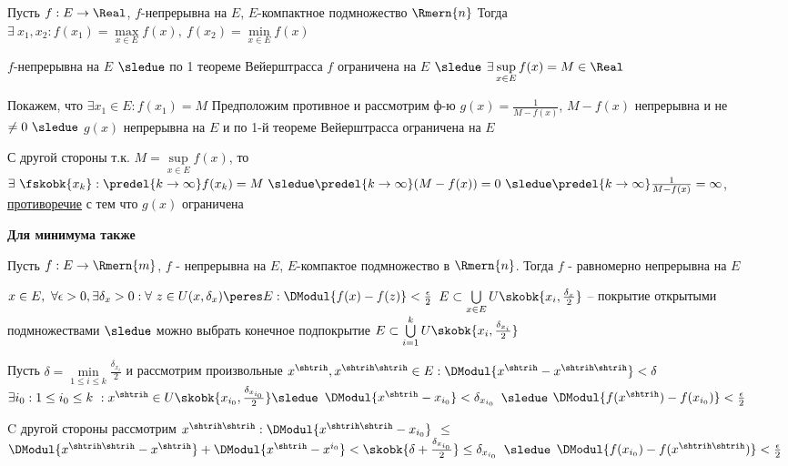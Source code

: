 \begin{proofs}
	Пусть $f:E \to \Real$, $f$-непрерывна на $E$, $E$-компактное подмножество $\Rmern{n}$ Тогда $\exists \ x_1,x_2 : f(x_1)=\max\limits_{x \in E}f(x), \ f(x_2)=\min\limits_{x \in E}f(x)$
	\begin{dokvo}
		$f$-непрерывна на $E$ $\sledue$ по 1 теореме Вейерштрасса $f$ ограничена на $E$ $\sledue$ $\exists \sup\limits_{x\in E}f(x)=M\in \Real$

		Покажем, что $\exists x_1 \in E : f(x_1)=M$ Предположим противное и рассмотрим ф-ю $g(x) = \frac{1}{M-f(x)}$, $M-f(x)$ непрерывна и не $\neq 0 \ \sledue$ $g(x)$ непрерывна на $E$ и по 1-й теореме Вейерштрасса ограничена на $E$

		С другой стороны т.к. $M=\sup\limits_{x\in E}f(x)$, то $\exists \ \fskobk{x_k}: \predel{k\to \infty}f(x_k)=M \ \sledue \predel{k\to \infty}(M-f(x))=0 \ \sledue \predel{k\to \infty}\frac{1}{M-f(x)}=\infty$, \underline{противоречие} с тем что $g(x)$ ограничена

		\textbf{Для минимума также}
	\end{dokvo}
\end{proofs}

\begin{proofs}
	Пусть $f:E\to \Rmern{m}$, $f$ - непрерывна на $E$, $E$-компактое подмножество в $\Rmern{n}$. Тогда $f$ - равномерно непрерывна на $E$
	\begin{dokvo}
		$x \in E, \ \forall \epsilon > 0, \exists \delta_x > 0: \forall \ z\in U(x, \delta_x)\peres E: \DModul{f(x)-f(z)}< \frac{\epsilon}{2}$
		$E \subset \bigcup\limits_{x\in E}U\skobk{x_i,\frac{\delta_x}{2}}$ -- покрытие открытыми подмножествами $\sledue$ можно выбрать конечное подпокрытие $E \subset \bigcup\limits_{i=1}^{k}U\skobk{x_i,\frac{\delta_{x_{i}}}{2}}$

		Пусть $\delta = \min\limits_{1 \leq i \leq k}\frac{\delta_{x_{i}}}{2}$ и рассмотрим произвольные $x^{\shtrih},x^{\shtrih\shtrih} \in E: \DModul{x^{\shtrih} - x^{\shtrih\shtrih}} < \delta$ $\exists i_0: 1 \leq i_0 \leq k \ : x^{\shtrih} \in U\skobk{x_{i_0},\frac{\delta_{x_{i_0}}}{2}} \sledue$ $\DModul{x^{\shtrih} - x_{i_0}} < \delta_{x_{i_0}}$ $\sledue$ $\DModul{f(x^{\shtrih}) - f(x_{i_0})} < \frac{\epsilon}{2}$

		C другой стороны рассмотрим $x^{\shtrih\shtrih}:\DModul{x^{\shtrih\shtrih} - x_{i_0} }$
		$\leq$ $\DModul{x^{\shtrih\shtrih} - x^{\shtrih}} + \DModul{x^{\shtrih} - x^{i_0}} < \skobk{\delta + \frac{\delta_{x_{i_0}}}{2}} \leq \delta_{x_{i_0}}$ $\sledue$ $\DModul{f(x_{i_0}) - f(x^{\shtrih\shtrih})} < \frac{\epsilon}{2}$
	\end{dokvo}

\end{proofs}

